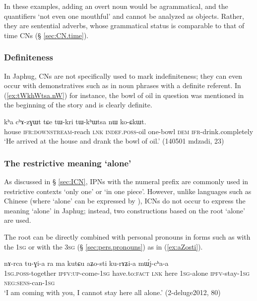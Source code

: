 In these examples, adding an overt noun would be agrammatical, and the quantifiers  `not even one mouthful' and  cannot be analyzed as objects. Rather, they are sentential adverbs, whose grammatical status is comparable to that of time CNs (§ \ref{sec:CN.time}).

\subsubsection{Definiteness}
In Japhug, CNs are not specifically used to mark indefiniteness; they can even occur with demonstratives such as  in noun phrases with a definite referent. In  (\ref{ex:tWkhWtsa.nW}) for instance, the bowl of oil in question was mentioned in the beginning of the story and is clearly definite.

\begin{exe}
\ex \label{ex:tWkhWtsa.nW}
\gll kʰa cʰɤ-zɣɯt tɕe tɯ-kri tɯ-kʰɯtsa nɯ ko-ɕkɯt.  \\
house \textsc{ifr}:\textsc{downstream}-reach \textsc{lnk} \textsc{indef}.\textsc{poss}-oil one-bowl \textsc{dem} \textsc{ifr}-drink.completely \\
\glt `He arrived at the house and drank the bowl of oil.' (140501 mdzadi, 23)
\end{exe}

\subsubsection{The restrictive meaning `alone'} \label{sec:stWsti}
As discussed in § \ref{sec:ICN},  IPNs with the numeral prefix  are commonly used in restrictive contexts `only one' or  `in one piece'. However, unlike languages such as Chinese (where  `alone' can be expressed by ), ICNs do not occur to express the meaning `alone' in Japhug; instead, two constructions based on the root  `alone' are used.

The root  can be directly combined with personal pronouns in forms such as  with the \textsc{1sg}  or  with the \textsc{3sg}   (§ \ref{sec:pers.pronouns}) as in (\ref{ex:aZosti}).

\begin{exe}
\ex \label{ex:aZosti}
\gll   nɤ-rca tu-ɣi-a ra ma kutɕu aʑo-sti ku-rɤʑi-a mɯ́j-cʰa-a \\
 \textsc{1sg}.\textsc{poss}-together \textsc{ipfv}:\textsc{up}-come-\textsc{1sg} have.to:\textsc{fact} \textsc{lnk} here \textsc{1sg}-alone \textsc{ipfv}-stay-\textsc{1sg} \textsc{neg}:\textsc{sens}-can-\textsc{1sg} \\
\glt `I am coming with you, I cannot stay here all alone.' (2-deluge2012, 80)
\end{exe}

